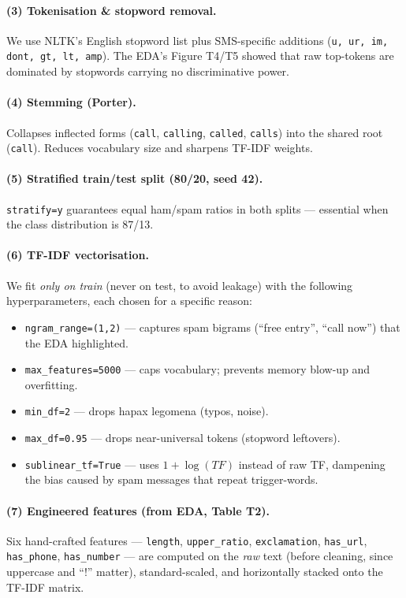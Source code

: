 \paragraph{(3) Tokenisation \& stopword removal.} We use NLTK's English stopword list plus SMS-specific additions (\texttt{u, ur, im, dont, gt, lt, amp}). The EDA's Figure T4/T5 showed that raw top-tokens are dominated by stopwords carrying no discriminative power.

\paragraph{(4) Stemming (Porter).} Collapses inflected forms (\texttt{call}, \texttt{calling}, \texttt{called}, \texttt{calls}) into the shared root (\texttt{call}). Reduces vocabulary size and sharpens TF-IDF weights.

\paragraph{(5) Stratified train/test split (80/20, seed 42).} \texttt{stratify=y} guarantees equal ham/spam ratios in both splits --- essential when the class distribution is 87/13.

\paragraph{(6) TF-IDF vectorisation.} We fit \emph{only on train} (never on test, to avoid leakage) with the following hyperparameters, each chosen for a specific reason:
\begin{itemize}
    \item \texttt{ngram\_range=(1,2)} --- captures spam bigrams (``free entry'', ``call now'') that the EDA highlighted.
    \item \texttt{max\_features=5000} --- caps vocabulary; prevents memory blow-up and overfitting.
    \item \texttt{min\_df=2} --- drops hapax legomena (typos, noise).
    \item \texttt{max\_df=0.95} --- drops near-universal tokens (stopword leftovers).
    \item \texttt{sublinear\_tf=True} --- uses $1 + \log(TF)$ instead of raw TF, dampening the bias caused by spam messages that repeat trigger-words.
\end{itemize}

\paragraph{(7) Engineered features (from EDA, Table T2).} Six hand-crafted features --- \texttt{length}, \texttt{upper\_ratio}, \texttt{exclamation}, \texttt{has\_url}, \texttt{has\_phone}, \texttt{has\_number} --- are computed on the \emph{raw} text (before cleaning, since uppercase and ``!'' matter), standard-scaled, and horizontally stacked onto the TF-IDF matrix.

